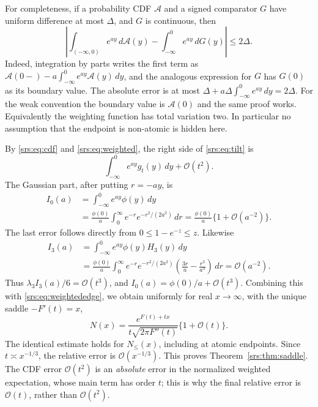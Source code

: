 \documentclass[11pt]{article}
\numberwithin{equation}{section}
\theoremstyle{remark}\newtheorem{remark}[theorem]{Remark}
\newcommand{\Oh}{\mathcal O}
\begin{document}
For completeness, if a probability CDF $\mathcal A$ and a signed comparator $G$ have uniform difference at most $\Delta$, and $G$ is continuous, then
\begin{equation}\label{srs:eq:weighted}
 \left|\int_{(-\infty,0)}e^{ay}\,d\mathcal A(y)
       -\int_{-\infty}^0e^{ay}\,dG(y)\right|\le2\Delta.
\end{equation}
Indeed, integration by parts writes the first term as
$\mathcal A(0-)-a\int_{-\infty}^0e^{ay}\mathcal A(y)\,dy$, and the analogous expression for $G$ has $G(0)$ as its boundary value. The absolute error is at most $\Delta+a\Delta\int_{-\infty}^0e^{ay}\,dy=2\Delta$. For the weak convention the boundary value is $\mathcal A(0)$ and the same proof works. Equivalently the weighting function has total variation two. In particular no assumption that the endpoint is non-atomic is hidden here.

By \eqref{srs:eq:cdf} and \eqref{srs:eq:weighted}, the right side of \eqref{srs:eq:tilt} is
\begin{equation}\label{srs:eq:weightededge}
 \int_{-\infty}^0e^{ay}g_t(y)\,dy+\Oh(t^2).
\end{equation}
The Gaussian part, after putting $r=-ay$, is
\begin{align}
 I_0(a)&=\int_{-\infty}^0e^{ay}\phi(y)\,dy\\
 &=\frac{\phi(0)}a\int_0^\infty e^{-r}e^{-r^2/(2a^2)}\,dr
 =\frac{\phi(0)}a\{1+\Oh(a^{-2})\}.
\end{align}
The last error follows directly from $0\le1-e^{-z}\le z$. Likewise
\begin{align}
 I_3(a)&=\int_{-\infty}^0e^{ay}\phi(y)H_3(y)\,dy\\
 &=\frac{\phi(0)}a\int_0^\infty e^{-r}e^{-r^2/(2a^2)}
 \left(\frac{3r}a-\frac{r^3}{a^3}\right)\,dr
 =\Oh(a^{-2}).
\end{align}
Thus $\lambda_3 I_3(a)/6=\Oh(t^3)$, and $I_0(a)=\phi(0)/a+\Oh(t^3)$. Combining this with \eqref{srs:eq:weightededge}, we obtain uniformly for real $x\to\infty$, with the unique saddle $-F'(t)=x$,
\begin{equation}\label{srs:eq:sharpsaddle}
 N(x)=\frac{e^{F(t)+tx}}{t\sqrt{2\pi F''(t)}}\{1+\Oh(t)\}.
\end{equation}
The identical estimate holds for $N_{\le}(x)$, including at atomic endpoints. Since $t\asymp x^{-1/3}$, the relative error is $\Oh(x^{-1/3})$.
This proves Theorem~\ref{srs:thm:saddle}.
The CDF error $\Oh(t^2)$ is an \emph{absolute} error in the normalized weighted expectation, whose main term has order $t$; this is why the final relative error is $\Oh(t)$, rather than $\Oh(t^2)$.
\end{document}
